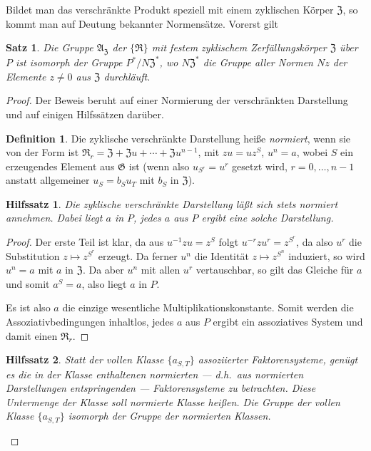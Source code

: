 \documentclass[12pt,a4paper]{article}
\theoremstyle{plain}
\newtheorem{satz}{Satz}[section]
\newtheorem{hilfssatz}{Hilfssatz}[section]
\theoremstyle{definition}
\newtheorem{definition}{Definition}[section]
\theoremstyle{remark}
\begin{document}
Bildet man das verschr\"ankte Produkt speziell mit einem zyklischen
K\"orper $\mathfrak{Z}$, so kommt man auf Deutung bekannter Normens\"atze.
Vorerst gilt

\begin{satz}\label{satz:30-1}
Die Gruppe $\mathfrak{A}_{\mathfrak{Z}}$ der $\{\mathfrak{R}\}$ mit festem zyklischem
Zerf\"allungsk\"orper $\mathfrak{Z}$ \"uber $P$ ist isomorph der Gruppe
$P^{*}/N\mathfrak{Z}^{*}$, wo $N\mathfrak{Z}^{*}$ die Gruppe aller Normen $Nz$
der Elemente $z \neq 0$ aus $\mathfrak{Z}$ durchl\"auft.
\end{satz}

\begin{proof}
Der Beweis beruht auf einer Normierung der verschr\"ankten
Darstellung und auf einigen Hilfss\"atzen dar\"uber.

\begin{definition}
Die zyklische verschr\"ankte Darstellung hei\ss e \textit{normiert}, wenn
sie von der Form ist $\mathfrak{R}_{r} = \mathfrak{Z} + \mathfrak{Z}u + \cdots + \mathfrak{Z}u^{n-1}$,
mit $zu = uz^{S}$, $u^{n} = a$, wobei $S$ ein erzeugendes Element aus
$\mathfrak{G}$ ist (wenn also $u_{S^{r}} = u^{r}$ gesetzt wird,
$r = 0, \ldots, n-1$ anstatt allgemeiner $u_{S} = b_{S}u_{T}$ mit
$b_{S}$ in $\mathfrak{Z}$).
\end{definition}

\begin{hilfssatz}\label{hilf:30-1}
Die zyklische verschr\"ankte Darstellung l\"a\ss t sich stets normiert
annehmen. Dabei liegt $a$ in $P$, jedes $a$ aus $P$ ergibt eine
solche Darstellung.
\end{hilfssatz}

\begin{proof}
Der erste Teil ist klar, da aus $u^{-1}zu = z^{S}$ folgt
$u^{-r}zu^{r} = z^{S^{r}}$, da also $u^{r}$ die Substitution $z \mapsto z^{S^{r}}$
erzeugt. Da ferner $u^{n}$ die Identit\"at $z \mapsto z^{S^{n}}$ induziert, so
wird $u^{n} = a$ mit $a$ in $\mathfrak{Z}$. Da aber $u^{n}$ mit allen $u^{r}$
vertauschbar, so gilt das Gleiche f\"ur $a$ und somit $a^{S} = a$,
also liegt $a$ in $P$.

Es ist also $a$ die einzige wesentliche Multiplikationskonstante.
Somit werden die Assoziativbedingungen inhaltlos, jedes $a$ aus $P$
ergibt ein assoziatives System und damit einen $\mathfrak{R}_{r}$.
\end{proof}

\begin{hilfssatz}\label{hilf:30-2}
Statt der vollen Klasse $\{a_{S,T}\}$ assoziierter Faktorensysteme,
gen\"ugt es die in der Klasse enthaltenen normierten --- d.h.\ aus
normierten Darstellungen entspringenden --- Faktorensysteme zu
betrachten. Diese Untermenge der Klasse soll \textit{normierte Klasse}
hei\ss en. Die Gruppe der vollen Klasse $\{a_{S,T}\}$ isomorph der
Gruppe der normierten Klassen.
\end{hilfssatz}


\end{proof}
\end{document}
